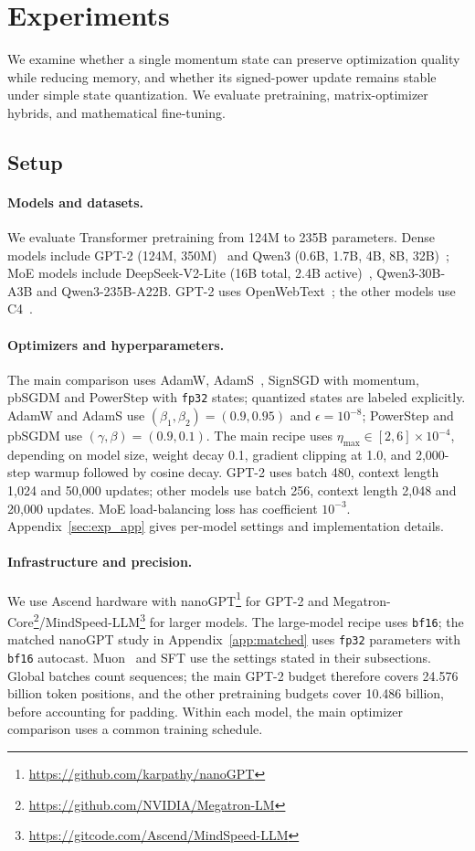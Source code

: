 \documentclass{article}
\begin{document}
\section{Experiments}\label{sec:exp}
We examine whether a single momentum state can preserve optimization quality while reducing memory, and whether its signed-power update remains stable under simple state quantization. We evaluate pretraining, matrix-optimizer hybrids, and mathematical fine-tuning.
\subsection{Setup}
\paragraph{Models and datasets.}
We evaluate Transformer pretraining from 124M to 235B parameters. Dense models include GPT-2 (124M, 350M)~\citep{radford2019language} and Qwen3 (0.6B, 1.7B, 4B, 8B, 32B)~\citep{yang2025qwen3}; MoE models include DeepSeek-V2-Lite (16B total, 2.4B active)~\citep{deepseekai2024deepseekv2}, Qwen3-30B-A3B and Qwen3-235B-A22B. GPT-2 uses OpenWebText~\citep{Gokaslan2019OpenWeb}; the other models use C4~\citep{raffel2020exploring}.

\paragraph{Optimizers and hyperparameters.}
The main comparison uses AdamW, AdamS~\citep{zhang2025adams}, SignSGD with momentum, pbSGDM and PowerStep with \texttt{fp32} states; quantized states are labeled explicitly. AdamW and AdamS use $(\beta_1,\beta_2)=(0.9,0.95)$ and $\epsilon=10^{-8}$; PowerStep and pbSGDM use $(\gamma,\beta)=(0.9,0.1)$. The main recipe uses $\eta_{\max}\in[2,6]\times10^{-4}$, depending on model size, weight decay 0.1, gradient clipping at 1.0, and 2,000-step warmup followed by cosine decay. GPT-2 uses batch 480, context length 1,024 and 50,000 updates; other models use batch 256, context length 2,048 and 20,000 updates. MoE load-balancing loss has coefficient $10^{-3}$. Appendix~\ref{sec:exp_app} gives per-model settings and implementation details.

\paragraph{Infrastructure and precision.}
We use Ascend hardware with nanoGPT\footnote{\url{https://github.com/karpathy/nanoGPT}} for GPT-2 and Megatron-Core\footnote{\url{https://github.com/NVIDIA/Megatron-LM}}/MindSpeed-LLM\footnote{\url{https://gitcode.com/Ascend/MindSpeed-LLM}} for larger models. The large-model recipe uses \texttt{bf16}; the matched nanoGPT study in Appendix~\ref{app:matched} uses \texttt{fp32} parameters with \texttt{bf16} autocast. Muon~\citep{jordan2024muon} and SFT use the settings stated in their subsections. Global batches count sequences; the main GPT-2 budget therefore covers 24.576 billion token positions, and the other pretraining budgets cover 10.486 billion, before accounting for padding. Within each model, the main optimizer comparison uses a common training schedule.
\end{document}
